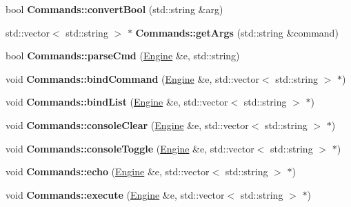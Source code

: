 \begin{DoxyCompactItemize}
\item 
bool {\bfseries Commands\+::convert\+Bool} (std\+::string \&arg)\hypertarget{Commands_8hh_abefc016d0d849fec28bcec9eb5c5b106}{}\label{Commands_8hh_abefc016d0d849fec28bcec9eb5c5b106}

\item 
std\+::vector$<$ std\+::string $>$ $\ast$ {\bfseries Commands\+::get\+Args} (std\+::string \&command)\hypertarget{Commands_8hh_aa0b47ec166c1143d0dd20c51b301e6af}{}\label{Commands_8hh_aa0b47ec166c1143d0dd20c51b301e6af}

\item 
bool {\bfseries Commands\+::parse\+Cmd} (\hyperlink{classEngine}{Engine} \&e, std\+::string)\hypertarget{Commands_8hh_a37f1ccb092695e87da41e0625b240bee}{}\label{Commands_8hh_a37f1ccb092695e87da41e0625b240bee}

\item 
void {\bfseries Commands\+::bind\+Command} (\hyperlink{classEngine}{Engine} \&e, std\+::vector$<$ std\+::string $>$ $\ast$)\hypertarget{Commands_8hh_ac98ddc07caa88b780eac831a7763db02}{}\label{Commands_8hh_ac98ddc07caa88b780eac831a7763db02}

\item 
void {\bfseries Commands\+::bind\+List} (\hyperlink{classEngine}{Engine} \&e, std\+::vector$<$ std\+::string $>$ $\ast$)\hypertarget{Commands_8hh_a6b9cff92e05b8ee3bbdf2183bcab0405}{}\label{Commands_8hh_a6b9cff92e05b8ee3bbdf2183bcab0405}

\item 
void {\bfseries Commands\+::console\+Clear} (\hyperlink{classEngine}{Engine} \&e, std\+::vector$<$ std\+::string $>$ $\ast$)\hypertarget{Commands_8hh_a1edaf40648864f95d6fabd821fa1ff69}{}\label{Commands_8hh_a1edaf40648864f95d6fabd821fa1ff69}

\item 
void {\bfseries Commands\+::console\+Toggle} (\hyperlink{classEngine}{Engine} \&e, std\+::vector$<$ std\+::string $>$ $\ast$)\hypertarget{Commands_8hh_a5ccaf75c545b581e6f56960a63789cc9}{}\label{Commands_8hh_a5ccaf75c545b581e6f56960a63789cc9}

\item 
void {\bfseries Commands\+::echo} (\hyperlink{classEngine}{Engine} \&e, std\+::vector$<$ std\+::string $>$ $\ast$)\hypertarget{Commands_8hh_acf0412f16ea578d5fa8a56804db65edf}{}\label{Commands_8hh_acf0412f16ea578d5fa8a56804db65edf}

\item 
void {\bfseries Commands\+::execute} (\hyperlink{classEngine}{Engine} \&e, std\+::vector$<$ std\+::string $>$ $\ast$)\hypertarget{Commands_8hh_a6cfb223a9b5b99372dd46ac74e45f05e}{}\label{Commands_8hh_a6cfb223a9b5b99372dd46ac74e45f05e}


\end{DoxyCompactItemize}
